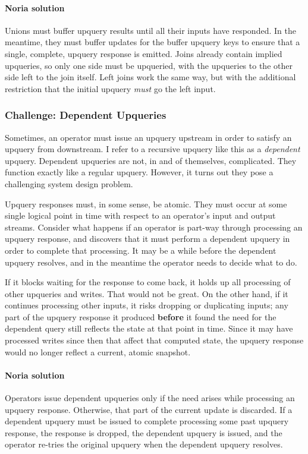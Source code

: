 \documentclass[fontsize=12pt,paper=letter]{scrartcl}
\begin{document}
\paragraph{Noria solution}
Unions must buffer upquery results until all their inputs have responded. In the
meantime, they must buffer updates for the buffer upquery keys to ensure that a
single, complete, upquery response is emitted. Joins already contain implied
upqueries, so only one side must be upqueried, with the upqueries to the other
side left to the join itself. Left joins work the same way, but with the
additional restriction that the initial upquery \emph{must} go the left input.

\subsubsection{Challenge: Dependent Upqueries}

Sometimes, an operator must issue an upquery upstream in order to
satisfy an upquery from downstream. I refer to a recursive upquery like
this as a \emph{dependent} upquery. Dependent upqueries are not, in and of
themselves, complicated. They function exactly like a regular upquery.
However, it turns out they pose a challenging system design problem.

Upquery responses must, in some sense, be atomic. They must occur at
some single logical point in time with respect to an operator's input
and output streams. Consider what happens if an operator is part-way
through processing an upquery response, and discovers that it must
perform a dependent upquery in order to complete that processing. It may
be a while before the dependent upquery resolves, and in the meantime
the operator needs to decide what to do.

If it blocks waiting for the response to come back, it holds up all
processing of other upqueries and writes. That would not be great. On
the other hand, if it continues processing other inputs, it risks
dropping or duplicating inputs; any part of the upquery response it
produced \textbf{before} it found the need for the dependent query still
reflects the state at that point in time. Since it may have processed
writes since then that affect that computed state, the upquery response
would no longer reflect a current, atomic snapshot.

\paragraph{Noria solution}
Operators issue dependent upqueries only if the need arises while processing an
upquery response. Otherwise, that part of the current update is discarded. If a
dependent upquery must be issued to complete processing some past upquery
response, the response is dropped, the dependent upquery is issued, and the
operator re-tries the original upquery when the dependent upquery resolves.
\end{document}
